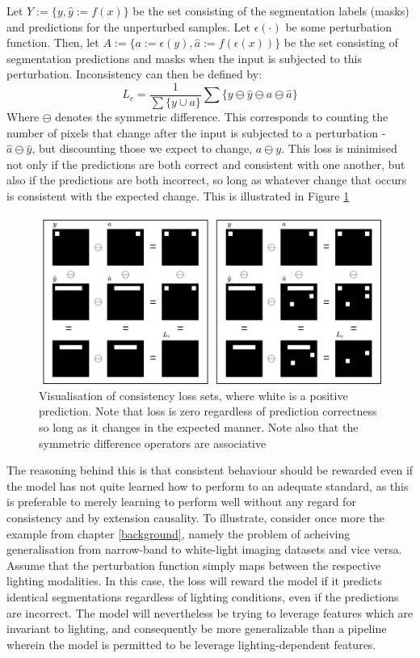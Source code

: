 	Let \(Y:=\{y,\hat{y}:=f(x)\}\) be the set consisting of the segmentation labels (masks) and predictions for the unperturbed samples. Let \(\epsilon(\cdot)\) be some perturbation function. Then, let \(A:=\{a:=\epsilon(y),\hat{a}:=f(\epsilon(x))\}\) be the set consisting of segmentation predictions and masks when the input is subjected to this perturbation. Inconsistency can then be defined by:
    \begin{equation}
		L_c = \frac{1}{\sum\{y \cup a \}} \sum \{y\ominus\hat{y}\ominus a\ominus\hat{a}\}
	\end{equation}
    Where \(\ominus \) denotes the symmetric difference. 
	This corresponds to counting the number of pixels that change after the input is subjected to a perturbation - \(\hat{a}\ominus \hat{y}\), but discounting those we expect to change, \(a\ominus y\). 
	This loss is minimised not only if the predictions are both correct and consistent with one another, but also if the predictions are both incorrect, so long as whatever change that occurs is consistent with the expected change. This is illustrated in Figure \ref{loss_fn}
    \begin{figure}[h]
        \includegraphics[width=\linewidth]{illustrations/loss_visualisation.drawio.png}
        \caption{Visualisation of consistency loss sets, where white is a positive prediction. Note that loss is zero regardless of prediction correctness so long as it changes in the expected manner. Note also that the symmetric difference operators are associative}
        \label{loss_fn}
    \end{figure}  

    The reasoning behind this is that consistent behaviour should be rewarded even if the model has not quite learned how to perform to an adequate standard, as this is preferable to merely learning to perform well without any regard for consistency and by extension causality.  To illustrate, consider once more the example from chapter \ref{background}, namely the problem of acheiving generalisation from narrow-band to white-light imaging datasets and vice versa. Assume that the perturbation function simply maps between the respective lighting modalities. In this case, the loss will reward the model if it predicts identical segmentations regardless of lighting conditions, even if the predictions are incorrect. The model will nevertheless be trying to leverage features which are invariant to lighting, and consequently be more generalizable than a pipeline wherein the model is permitted to be leverage lighting-dependent features.
        
